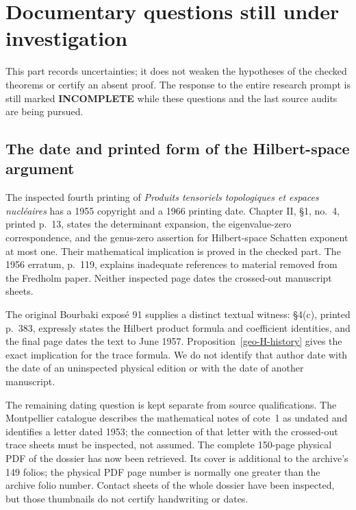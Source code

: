 \section{Documentary questions still under investigation}

This part records uncertainties; it does not weaken the hypotheses of
the checked theorems or certify an absent proof. The response to the
entire research prompt is still marked \textbf{INCOMPLETE} while these
questions and the last source audits are being pursued.

\subsection{The date and printed form of the Hilbert-space argument}

The inspected fourth printing of \emph{Produits tensoriels topologiques
et espaces nucl\'eaires} has a 1955 copyright and a 1966 printing date.
Chapter II, \S1, no.~4, printed p.~13, states the determinant expansion,
the eigenvalue-zero correspondence, and the genus-zero assertion for
Hilbert-space Schatten exponent at most one. Their mathematical
implication is proved in the checked part. The 1956 erratum, p.~119,
explains inadequate references to material removed from the Fredholm
paper. Neither inspected page dates the crossed-out manuscript sheets.

The original Bourbaki expos\'e 91 supplies a distinct textual witness:
\S4(c), printed p.~383, expressly states the Hilbert product formula
and coefficient identities, and the final page dates the text to
June 1957. Proposition~\ref{geo-H-history} gives the exact implication
for the trace formula. We do not identify that author date with the
date of an uninspected physical edition or with the date of another
manuscript.

The remaining dating question is kept separate from source qualifications. The
Montpellier catalogue describes the mathematical notes of cote~1 as
undated and identifies a letter dated 1953; the connection of that
letter with the crossed-out trace sheets must be inspected, not
assumed. The complete 150-page physical PDF of the dossier has now
been retrieved. Its cover is additional to the archive's 149 folios;
the physical PDF page number is normally one greater than the archive
folio number. Contact sheets of the whole dossier have been inspected,
but those thumbnails do not certify handwriting or dates.

